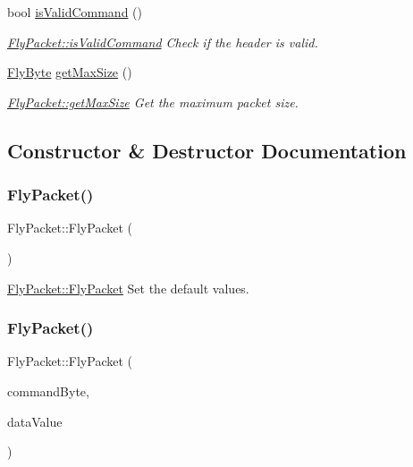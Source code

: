 \begin{DoxyCompactItemize}
bool \hyperlink{class_fly_packet_a32bdd283c8d5961adb20524a14269224}{is\+Valid\+Command} ()
\begin{DoxyCompactList}\small\item\em \hyperlink{class_fly_packet_a32bdd283c8d5961adb20524a14269224}{Fly\+Packet\+::is\+Valid\+Command} Check if the header is valid. \end{DoxyCompactList}\item 
\hyperlink{conversions_8h_a1f006e31a957accfe6aa1bf6f401efce}{Fly\+Byte} \hyperlink{class_fly_packet_ad8406536002965db603f5c9f03906794}{get\+Max\+Size} ()
\begin{DoxyCompactList}\small\item\em \hyperlink{class_fly_packet_ad8406536002965db603f5c9f03906794}{Fly\+Packet\+::get\+Max\+Size} Get the maximum packet size. \end{DoxyCompactList}\end{DoxyCompactItemize}


\subsection{Constructor \& Destructor Documentation}
\hypertarget{class_fly_packet_aca19954f7e01d839b5759245a9950d57}{}\label{class_fly_packet_aca19954f7e01d839b5759245a9950d57} 
\subsubsection{\texorpdfstring{Fly\+Packet()}{FlyPacket()}\hspace{0.1cm}{\footnotesize\ttfamily [1/3]}}
{\footnotesize\ttfamily Fly\+Packet\+::\+Fly\+Packet (\begin{DoxyParamCaption}{ }\end{DoxyParamCaption})}



\hyperlink{class_fly_packet_aca19954f7e01d839b5759245a9950d57}{Fly\+Packet\+::\+Fly\+Packet} Set the default values. 

\hypertarget{class_fly_packet_ac6a9ad5c29755d32ae52bb3526563d79}{}\label{class_fly_packet_ac6a9ad5c29755d32ae52bb3526563d79} 
\subsubsection{\texorpdfstring{Fly\+Packet()}{FlyPacket()}\hspace{0.1cm}{\footnotesize\ttfamily [2/3]}}
{\footnotesize\ttfamily Fly\+Packet\+::\+Fly\+Packet (\begin{DoxyParamCaption}\item[{\hyperlink{conversions_8h_a1f006e31a957accfe6aa1bf6f401efce}{Fly\+Byte}}]{command\+Byte,  }\item[{int}]{data\+Value }\end{DoxyParamCaption})}



